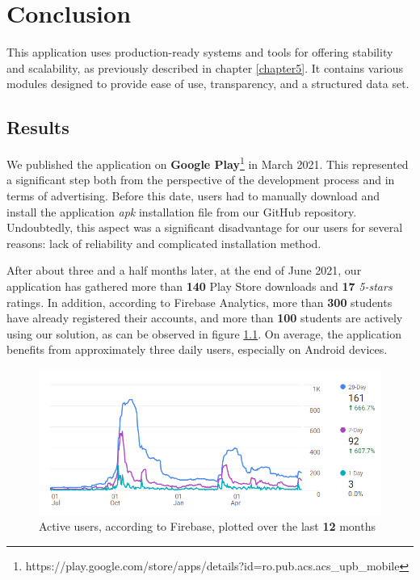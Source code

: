 \chapter{Conclusion} \label{chapter6}

    This application uses production-ready systems and tools for offering stability and scalability, as previously described in chapter \ref{chapter5}. It contains various modules designed to provide ease of use, transparency, and a structured data set.
    
\section{Results} \label{6:results}

    We published the application on \textbf{Google Play}\footnote{https://play.google.com/store/apps/details?id=ro.pub.acs.acs\_upb\_mobile} in March 2021. This represented a significant step both from the perspective of the development process and in terms of advertising. Before this date, users had to manually download and install the application \textit{\acrshort{apk}} installation file from our GitHub repository. Undoubtedly, this aspect was a significant disadvantage for our users for several reasons: lack of reliability and complicated installation method.
    
    After about three and a half months later, at the end of June 2021, our application has gathered more than \textbf{140} Play Store downloads and \textbf{17} \textit{5-stars} ratings. In addition, according to Firebase Analytics, more than \textbf{300} students have already registered their accounts, and more than \textbf{100} students are actively using our solution, as can be observed in figure \ref{6:fig:active_users}. On average, the application benefits from approximately three daily users, especially on Android devices. 
    
    \clearpage
    
    \begin{figure}[ht]
        \centering
             \includegraphics[height=0.25\textheight]{figures/charts/active_users.png}
        \caption{Active users, according to Firebase, plotted over the last \textbf{12} months}
        \label{6:fig:active_users}
    \end{figure}
    
